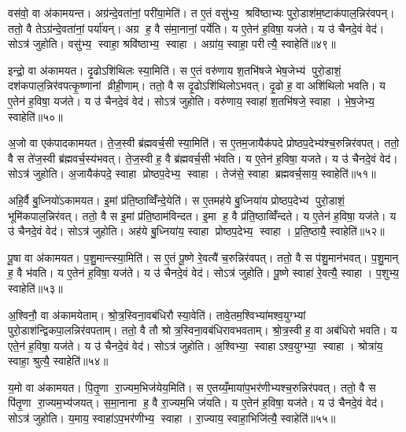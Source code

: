 वस॑वो॒ वा अ॑कामयन्त। अग्र॑न्दे॒वता॑नां॒ परी॑या॒मेति॑। त ए॒तं वसु॑भ्य॒ श्रवि॑ष्ठाभ्यः पुरो॒डाश॑म॒ष्टाक॑पाल॒न्निर॑वपन्। ततो॒ वै तेऽग्र॑न्दे॒वता॑नां॒ पर्या॑यन्। अग्र ह॒ वै स॑मा॒नानां॒ पर्ये॑ति। य ए॒तेन॑ ह॒विषा॒ यज॑ते। य उ॑ चैनदे॒वं वेद॑। सोऽत्र॑ जुहोति। वसु॑भ्य॒ स्वाहा॒ श्रवि॑ष्ठाभ्य॒ स्वाहा। अग्रा॑य॒ स्वाहा॒ परीत्यै॒ स्वाहेति॑॥४९॥

इन्द्रो॒ वा अ॑कामयत। दृ॒ढोऽशि॑थिलः स्या॒मिति॑। स ए॒तं वरु॑णाय श॒तभि॑षजे भेष॒जेभ्य॑ पुरो॒डाशं॒ दश॑कपाल॒न्निर॑वपत्कृ॒ष्णानां व्रीही॒णाम्। ततो॒ वै स दृ॒ढोऽशि॑थिलोऽभवत्। दृ॒ढो ह॒ वा अशि॑थिलो भवति। य ए॒तेन॑ ह॒विषा॒ यज॑ते। य उ॑ चैनदे॒वं वेद॑। सोऽत्र॑ जुहोति। वरु॑णाय॒ स्वाहा॑ श॒तभि॑षजे॒ स्वाहा। भे॒ष॒जेभ्य॒ स्वाहेति॑॥५०॥

अ॒जो वा एक॑पादकामयत। ते॒ज॒स्वी ब्र॑ह्मवर्च॒सी स्या॒मिति॑। स ए॒तम॒जायैक॑पदे प्रोष्ठप॒देभ्य॑श्च॒रुन्निर॑वपत्। ततो॒ वै स ते॑ज॒स्वी ब्र॑ह्मवर्च॒स्य॑भवत्। ते॒ज॒स्वी ह॒ वै ब्र॑ह्मवर्च॒सी भ॑वति। य ए॒तेन॑ ह॒विषा॒ यजते। य उ॑ चैनदे॒वं वेद॑। सोऽत्र॑ जुहोति। अ॒जायैक॑पदे॒ स्वाहा प्रोष्ठप॒देभ्य॒ स्वाहा। तेज॑से॒ स्वाहा ब्रह्मवर्च॒साय॒ स्वाहेति॑॥५१॥

अहि॒र्वै बु॒ध्नियो॑ऽकामयत। इ॒मां प्र॑ति॒ष्ठाव्विँ॑न्दे॒येति॑। स ए॒तमह॑ये बु॒ध्निया॑य प्रोष्ठप॒देभ्य॑ पुरो॒डाशं॒ भूमि॑कपाल॒न्निर॑वत्। ततो॒ वै स इ॒मां प्र॑ति॒ष्ठाम॑विन्दत। इ॒मा ह॒ वै प्र॑ति॒ष्ठाव्विँ॑न्दते। य ए॒तेन॑ ह॒विषा॒ यज॑ते। य उ॑ चैनदे॒वं वेद॑। सोऽत्र॑ जुहोति। अह॑ये बु॒ध्निया॑य॒ स्वाहा प्रोष्ठप॒देभ्य॒ स्वाहा। प्र॒ति॒ष्ठायै॒ स्वाहेति॑॥५२॥

पू॒षा वा अ॑कामयत। प॒शु॒मान्त्स्या॒मिति॑। स ए॒तं पू॒ष्णे रे॒वत्यै॑ च॒रुन्निर॑वपत्। ततो॒ वै स प॑शु॒मान॑भवत्। प॒शु॒मान् ह॒ वै भ॑वति। य ए॒तेन॑ ह॒विषा॒ यज॑ते। य उ॑ चैनदे॒वं वेद॑। सोऽत्र॑ जुहोति। पू॒ष्णे स्वाहा॑ रे॒वत्यै॒ स्वाहा। प॒शुभ्य॒ स्वाहेति॑॥५३॥

अ॒श्विनौ॒ वा अ॑कामयेताम्। श्रो॒त्र॒स्विना॒वब॑धिरौ स्या॒वेति॑। तावे॒तम॒श्विभ्या॑मश्व॒युग्भ्यां पुरो॒डाश॑न्द्विकपा॒लन्निर॑वपताम्। ततो॒ वै तौ श्रोत्र॒स्विना॒वब॑धिरावभवताम्। श्रो॒त्र॒स्वी ह॒ वा अब॑धिरो भवति। य एते॒न॑ ह॒विषा॒ यज॑ते। य उ॑ चैनदे॒वं वेद॑। सोऽत्र॑ जुहोति। अ॒श्विभ्या॒ स्वाहाऽश्व॒युग्भ्या॒ स्वाहा। श्रोत्रा॑य॒ स्वाहा॒ श्रुत्यै॒ स्वाहेति॑॥५४॥

य॒मो वा अ॑कामयत। पि॒तृ॒णा रा॒ज्यम॒भिज॑येय॒मिति॑। स ए॒तय्यँ॒माया॑प॒भर॑णीभ्यश्च॒रुन्निर॑पवत्। ततो॒ वै स पि॑तृ॒णा रा॒ज्यम॒भ्य॑जयत्। स॒मा॒नाना ह॒ वै रा॒ज्यम॒भि ज॑यति। य ए॒तेन॑ ह॒विषा॒ यज॑ते। य उ॑ चैनदे॒वं वेद॑। सोऽत्र॑ जुहोति। य॒माय॒ स्वाहा॑ऽप॒भर॑णीभ्य॒ स्वाहा। रा॒ज्याय॒ स्वाहा॒भिजि॑त्यै॒ स्वाहेति॑॥५५॥

